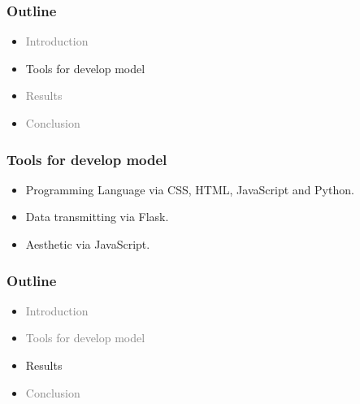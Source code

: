 \documentclass[fleqn]{beamer}
\begin{document}
\begin{frame}
\frametitle{Outline}
\begin{itemize}
\item \textcolor{gray}{Introduction} \\
\item Tools for develop model \\
\item \textcolor{gray}{Results} \\
\item \textcolor{gray}{Conclusion}
\end{itemize}
\end{frame}
\begin{frame}
\frametitle{Tools for develop model}
\begin{itemize}
\item Programming Language via CSS, HTML, JavaScript and Python. \\
\item Data transmitting via Flask. \\
\item Aesthetic via JavaScript.
\end{itemize}
\end{frame}
\begin{frame}
\frametitle{Outline}
\begin{itemize}
\item \textcolor{gray}{Introduction} \\
\item \textcolor{gray}{Tools for develop model} \\
\item Results \\
\item \textcolor{gray}{Conclusion} \\
\end{itemize}
\end{frame}
\end{document}
